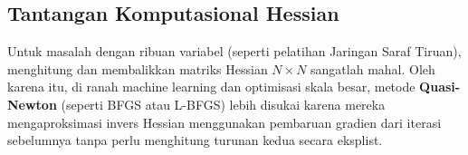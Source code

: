 \documentclass[11pt, a4paper]{article}
\begin{document}
\subsection{Tantangan Komputasional Hessian}
Untuk masalah dengan ribuan variabel (seperti pelatihan Jaringan Saraf Tiruan), menghitung dan membalikkan matriks Hessian $N \times N$ sangatlah mahal. Oleh karena itu, di ranah machine learning dan optimisasi skala besar, metode \textbf{Quasi-Newton} (seperti BFGS atau L-BFGS) lebih disukai karena mereka mengaproksimasi invers Hessian menggunakan pembaruan gradien dari iterasi sebelumnya tanpa perlu menghitung turunan kedua secara eksplist.
\end{document}
